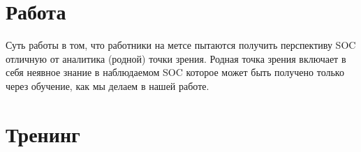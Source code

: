 \documentclass[12pt,]{article}
\begin{document}
\section{Работа}
Суть работы в том, что работники на метсе пытаются получить перспективу SOC отличную от аналитика (родной) точки зрения. Родная точка зрения включает в себя неявное знание в наблюдаемом SOC которое может быть получено только через обучение, как мы делаем в нашей работе.

\section{Тренинг}
\end{document}
